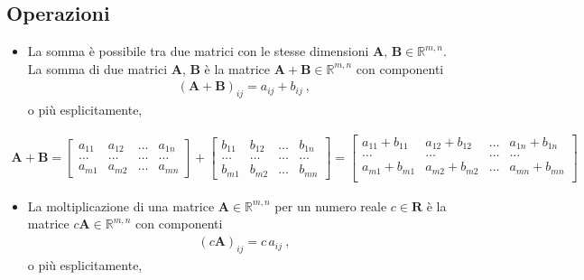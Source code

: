 \documentclass[letterpaper,10pt,italian]{jupyterBook}
\begin{document}
\subsection{Operazioni}
\label{\detokenize{ch/algebra/linear-algebra:operazioni}}\label{\detokenize{ch/algebra/linear-algebra:math-hs-algebra-linear-matrices-operations}}\begin{itemize}
\item {} 
\sphinxAtStartPar
{} La somma è possibile tra due matrici con le stesse dimensioni \(\mathbf{A},\, \mathbf{B} \in \mathbb{R}^{m,n}\). La somma di due matrici \(\mathbf{A}\), \(\mathbf{B}\) è la matrice \(\mathbf{A} + \mathbf{B} \in \mathbb{R}^{m,n}\) con componenti
\begin{equation*}
\begin{split}(\mathbf{A} + \mathbf{B})_{ij} = a_{ij} + b_{ij} \ ,\end{split}
\end{equation*}
\sphinxAtStartPar
o più esplicitamente,

\end{itemize}
\begin{equation*}
\begin{split} \mathbf{A} + \mathbf{B} = 
\begin{bmatrix}
  a_{11} & a_{12} & \dots & a_{1n} \\ \dots  & \dots  & \dots & \dots  \\ a_{m1} & a_{m2} & \dots & a_{mn}
\end{bmatrix}
+
\begin{bmatrix}
  b_{11} & b_{12} & \dots & b_{1n} \\ \dots  & \dots  & \dots & \dots  \\ b_{m1} & b_{m2} & \dots & b_{mn}
\end{bmatrix}
= 
\begin{bmatrix}
  a_{11}+b_{11} & a_{12}+b_{12} & \dots & a_{1n}+b_{1n} \\
  \dots  & \dots  & \dots & \dots  \\
  a_{m1}+b_{m1} & a_{m2}+b_{m2} & \dots & a_{mn}+b_{mn} \\
\end{bmatrix}
\end{split}
\end{equation*}\begin{itemize}
\item {} 
\sphinxAtStartPar
{} La moltiplicazione di una matrice \(\mathbf{A} \in \mathbb{R}^{m,n}\) per un numero reale \(c \in \mathbf{R}\) è la matrice \(c \mathbf{A} \in \mathbb{R}^{m,n}\) con componenti
\begin{equation*}
\begin{split}(c \mathbf{A})_{ij} = c \, a_{ij} \ ,\end{split}
\end{equation*}
\sphinxAtStartPar
o più esplicitamente,

\end{itemize}
\end{document}
